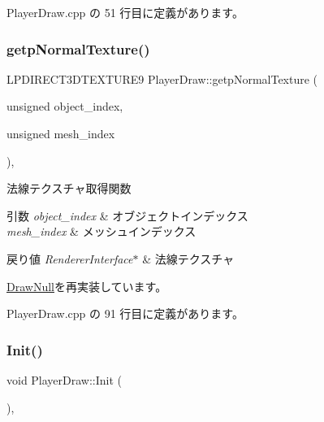  Player\+Draw.\+cpp の 51 行目に定義があります。

\mbox{\label{class_player_draw_a231aa618a0bf71311b61897ccf7191b8}} 
\subsubsection{\texorpdfstring{getp\+Normal\+Texture()}{getpNormalTexture()}}
{\footnotesize\ttfamily L\+P\+D\+I\+R\+E\+C\+T3\+D\+T\+E\+X\+T\+U\+R\+E9 Player\+Draw\+::getp\+Normal\+Texture (\begin{DoxyParamCaption}\item[{unsigned}]{object\+\_\+index,  }\item[{unsigned}]{mesh\+\_\+index }\end{DoxyParamCaption})\hspace{0.3cm}{\ttfamily [override]}, {\ttfamily [virtual]}}



法線テクスチャ取得関数 


\begin{DoxyParams}{引数}
{\em object\+\_\+index} & オブジェクトインデックス \\
\hline
{\em mesh\+\_\+index} & メッシュインデックス \\
\hline
\end{DoxyParams}

\begin{DoxyRetVals}{戻り値}
{\em Renderer\+Interface$\ast$} & 法線テクスチャ \\
\hline
\end{DoxyRetVals}


\mbox{\hyperlink{class_draw_null_abdb03713b973fd1f65c914fa146414a1}{Draw\+Null}}を再実装しています。



 Player\+Draw.\+cpp の 91 行目に定義があります。

\mbox{\label{class_player_draw_ad79a0fbeb618e0913822b573e5d0be68}} 
\subsubsection{\texorpdfstring{Init()}{Init()}}
{\footnotesize\ttfamily void Player\+Draw\+::\+Init (\begin{DoxyParamCaption}{ }\end{DoxyParamCaption})\hspace{0.3cm}{\ttfamily [override]}, {\ttfamily [virtual]}}



